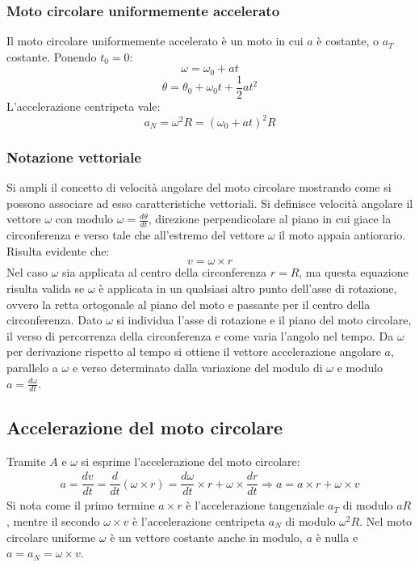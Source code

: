 \documentclass[class=book, crop=false, oneside, 12pt]{standalone}
\begin{document}
		\subsubsection{Moto circolare uniformemente accelerato}
		Il moto circolare uniformemente accelerato \`e un moto in cui $a$ \`e costante, o $a_T$ costante.
		Ponendo $t_0=0$:
		$$\omega=\omega_0+at$$
		$$\theta=\theta_0+\omega_0t+\dfrac{1}{2}at^2$$
		L'accelerazione centripeta vale:
		$$a_N=\omega^2R=(\omega_0+at)^2R$$
		\subsubsection{Notazione vettoriale}
		Si ampli il concetto di velocit\`a angolare del moto circolare mostrando come si possono associare ad esso caratteristiche vettoriali.
		Si definisce velocit\`a angolare il vettore $\omega$ con modulo $\omega=\frac{d\theta}{dt}$, direzione perpendicolare al piano in cui giace la circonferenza e verso tale che all'estremo del vettore $\omega$ il moto appaia antiorario.
		Risulta evidente che:
		$$v=\omega\times r$$
		Nel caso $\omega$ sia applicata al centro della circonferenza $r=R$, ma questa equazione risulta valida se $\omega$ \`e applicata in un qualsiasi altro punto dell'asse di rotazione, ovvero la retta ortogonale al piano del moto e passante per il centro della circonferenza.
		Dato $\omega$ si individua l'asse di rotazione e il piano del moto circolare, il verso di percorrenza della circonferenza e come varia l'angolo nel tempo.
		Da $\omega$ per derivazione rispetto al tempo si ottiene il vettore accelerazione angolare $a$, parallelo a $\omega$ e verso determinato dalla variazione del modulo di $\omega$ e modulo $a=\frac{d\omega}{dt}$.
	\subsection{Accelerazione del moto circolare}
		Tramite $A$ e $\omega$ si esprime l'accelerazione del moto circolare:
		\begin{align*}
			a=\dfrac{dv}{dt}=\dfrac{d}{dt}(\omega\times r)=\dfrac{d\omega}{dt}\times r + \omega\times\dfrac{dr}{dt}\Rightarrow a=a\times r+\omega\times v
		\end{align*}
		Si nota come il primo termine $a\times r$ \`e l'accelerazione tangenziale $a_T$ di modulo $aR$, mentre il secondo $\omega\times v$ \`e l'accelerazione centripeta $a_N$ di modulo $\omega^2R$.
		Nel moto circolare uniforme $\omega$ \`e un vettore costante anche in modulo, $a$ \`e nulla e $a=a_N=\omega\times v$.
\end{document}
